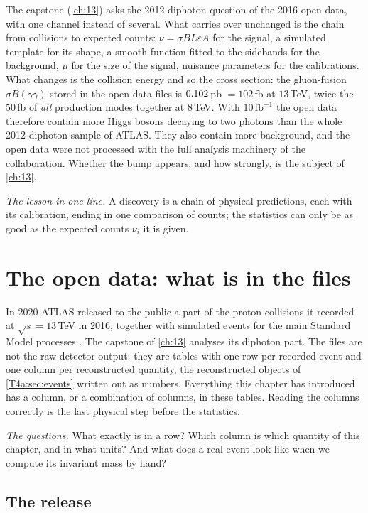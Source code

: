 The capstone (\cref{ch:13}) asks the 2012 diphoton question of the 2016 open data, with one channel instead of several. What carries over unchanged is the chain from collisions to expected counts: $\nu=\sigma BL\varepsilon A$ for the signal, a simulated template for its shape, a smooth function fitted to the sidebands for the background, $\mu$ for the size of the signal, nuisance parameters for the calibrations. What changes is the collision energy and so the cross section: the gluon-fusion $\sigma B(\gamma\gamma)$ stored in the open-data files is $0.102$\,pb $=102$\,fb at $13$\,TeV, twice the $50$\,fb of \emph{all} production modes together at $8$\,TeV. With $10\,\mathrm{fb^{-1}}$ the open data therefore contain more Higgs bosons decaying to two photons than the whole 2012 diphoton sample of ATLAS. They also contain more background, and the open data were not processed with the full analysis machinery of the collaboration. Whether the bump appears, and how strongly, is the subject of \cref{ch:13}.

\emph{The lesson in one line.} A discovery is a chain of physical predictions, each with its calibration, ending in one comparison of counts; the statistics can only be as good as the expected counts $\nu_i$ it is given.
\section{The open data: what is in the files}
\label{T4a:sec:opendata}

In 2020 ATLAS released to the public a part of the proton collisions it recorded at $\sqrt s=13$\,TeV in 2016, together with simulated events for the main Standard Model processes \cite{ATLASOpenData2020,SerkinOpenData2020}. The capstone of \cref{ch:13} analyses its diphoton part. The files are not the raw detector output: they are tables with one row per recorded event and one column per reconstructed quantity, the reconstructed objects of \cref{T4a:sec:events} written out as numbers. Everything this chapter has introduced has a column, or a combination of columns, in these tables. Reading the columns correctly is the last physical step before the statistics.

\emph{The questions.} What exactly is in a row? Which column is which quantity of this chapter, and in what units? And what does a real event look like when we compute its invariant mass by hand?

\subsection{The release}
\label{T4a:sec:release}

